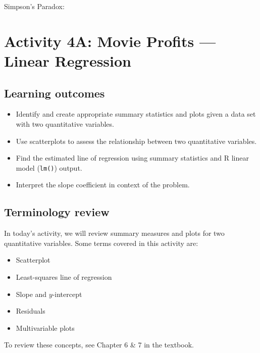 \documentclass[
]{report}
\begin{document}
Simpson's Paradox:

\newpage

\hypertarget{activity-4a-movie-profits-linear-regression}{%
\section{Activity 4A: Movie Profits --- Linear Regression}\label{activity-4a-movie-profits-linear-regression}}


\hypertarget{learning-outcomes-6}{%
\subsection{Learning outcomes}\label{learning-outcomes-6}}

\begin{itemize}
\item
  Identify and create appropriate summary statistics and plots
  given a data set with two quantitative variables.
\item
  Use scatterplots to assess the relationship between two quantitative variables.
\item
  Find the estimated line of regression using summary statistics and R linear model (\texttt{lm()}) output.
\item
  Interpret the slope coefficient in context of the problem.
\end{itemize}

\hypertarget{terminology-review-6}{%
\subsection{Terminology review}\label{terminology-review-6}}

In today's activity, we will review summary measures and plots for two quantitative variables. Some terms covered in this activity are:

\begin{itemize}
\item
  Scatterplot
\item
  Least-squares line of regression
\item
  Slope and \(y\)-intercept
\item
  Residuals
\item
  Multivariable plots
\end{itemize}

To review these concepts, see Chapter 6 \& 7 in the textbook.
\end{document}
